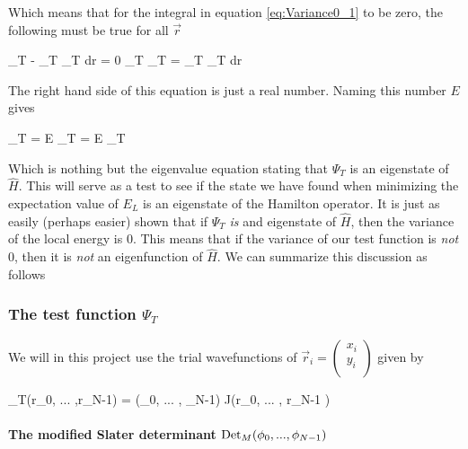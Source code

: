 Which means that for the integral in equation \ref{eq:Variance0_1} to be zero, the following must be true for all $\vec r$

\eqs
{}  \Psi_T  - \int \Psi_T  \Psi_T d\vec r  = 0
\eqf
\eqs
\Psi_T  \Psi_T = \int \Psi_T  \Psi_T d\vec r 
\eqf

The right hand side of this equation is just a real number. 
Naming this number $E$ gives 

\eqs
{}  \Psi_T = E 
\eqf
\eqs {}\Psi_T  = E \Psi_T  \eqf

Which is nothing but the eigenvalue equation stating that $\Psi_T$ is an eigenstate of $\hat{H}$.
This will serve as a test to see if the state we have found when minimizing the expectation value of $E_L$ is an eigenstate of the Hamilton operator. 
It is just as easily (perhaps easier) shown that if $\Psi_T$ \textit{is} and eigenstate of $\hat{H}$, then the variance of the local energy is $0$. 
This means that if the variance of our test function is \textit{not} $0$, then it is \textit{not} an eigenfunction of $\hat{H}$. 
We can summarize this discussion as follows

\eqs
{}
\eqf













\subsubsection{The test function $\Psi_T$}

We will in this project use the trial wavefunctions of $\vec r_i = \left ( \begin{matrix} x_i \\ y_i \\ \end{matrix}\right )$ given by 

\eqs
\Psi_T(\vec r_0, ... ,\vec r_{N-1})  = \Det(\phi_0,  ... , \phi_{N-1}) \cdot \textrm{J}(\vec r_0, ... , \vec r_{N-1} )
\label{eq:Trial_Wavefunction}
\eqf




\paragraph{The modified Slater determinant $\textrm{Det}_M(\phi_0,  ... , \phi_{N-1})$}

